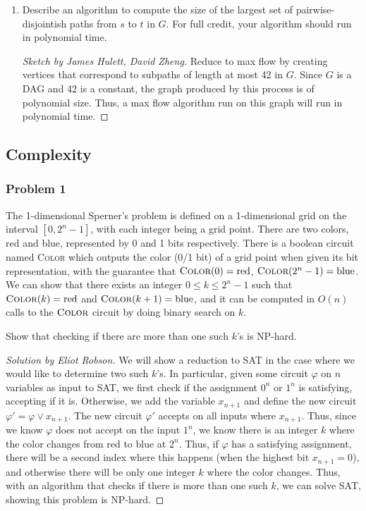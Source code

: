 \documentclass{article}
\newenvironment{sketch}[1]{\begin{proof}[Sketch by #1]}{\end{proof}}
\newenvironment{solution}[1]{\begin{proof}[Solution by #1]}{\end{proof}}
\begin{document}
\begin{enumerate}
	\item Describe an algorithm to compute the size of the largest set of pairwise-disjointish paths from \(s\) to \(t\) in \(G\). For full credit, your algorithm should run in polynomial time.
	
	\begin{sketch}{James Hulett, David Zheng}
		Reduce to max flow by creating vertices that correspond to subpaths of length at most 42 in \(G\). Since \(G\) is a DAG and 42 is a constant, the graph produced by this process is of polynomial size. Thus, a max flow algorithm run on this graph will run in polynomial time.
	\end{sketch}
\end{enumerate}



\subsection{Complexity}

\subsubsection{Problem 1}
The 1-dimensional Sperner's problem is defined on a 1-dimensional grid on the interval \([0, 2^{n}-1]\), with each integer being a grid point. There are two colors, red and blue, represented by 0 and 1 bits respectively. There is a boolean circuit named \textsc{Color} which outputs the color (0/1 bit) of a grid point when given its bit representation, with the guarantee that \(\textsc{Color}(0) = \text{red}\), \(\textsc{Color}(2^n - 1) = \text{blue}\). We can show that there exists an integer \(0 \leq k \leq 2^{n}-1\) such that \(\textsc{Color}(k) = \text{red}\) and \(\textsc{Color}(k+1) = \text{blue}\), and it can be computed in \(O(n)\) calls to the \(\textsc{Color}\) circuit by doing binary search on \(k\).

Show that checking if there are more than one such \(k\)'s is NP-hard. %

\begin{solution}{Eliot Robson}
	We will show a reduction to SAT in the case where we would like to determine two such \(k\)'s. In particular, given some circuit \(\varphi\) on \(n\) variables as input to SAT, we first check if the assignment \(0^n\) or \(1^n\) is satisfying, accepting if it is. Otherwise, we add the variable \(x_{n+1}\) and define the new circuit \(\varphi' = \varphi \vee x_{n+1}\). The new circuit \(\varphi'\) accepts on all inputs where \(x_{n+1}\). Thus, since we know \(\varphi\) does not accept on the input \(1^n\), we know there is an integer \(k\) where the color changes from red to blue at \(2^n\). Thus, if \(\varphi\) has a satisfying assignment, there will be a second index where this happens (when the highest bit \(x_{n+1} = 0\)), and otherwise there will be only one integer \(k\) where the color changes. Thus, with an algorithm that checks if there is more than one such \(k\), we can solve SAT, showing this problem is NP-hard.
\end{solution}
\end{document}
